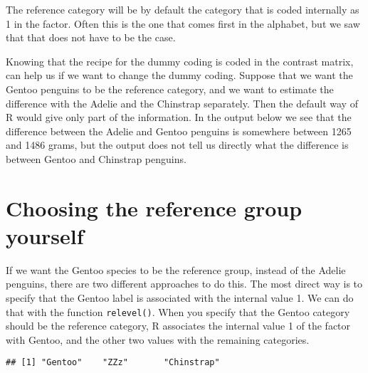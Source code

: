 The reference category will be by default the category that is coded internally as 1 in the factor. Often this is the one that comes first in the alphabet, but we saw that that does not have to be the case. 

Knowing that the recipe for the dummy coding is coded in the contrast matrix, can help us if we want to change the dummy coding. Suppose that we want the Gentoo penguins to be the reference category, and we want to estimate the difference with the Adelie and the Chinstrap separately. Then the default way of R would give only part of the information. In the output below we see that the difference between the Adelie and Gentoo penguins is somewhere between 1265 and 1486 grams, but the output does not tell us directly what the difference is between Gentoo and Chinstrap penguins. 


\begin{knitrout}
\color{fgcolor}
\end{knitrout}


\section{Choosing the reference group yourself}

If we want the Gentoo species to be the reference group, instead of the Adelie penguins, there are two different approaches to do this. The most direct way is to specify that the Gentoo label is associated with the internal value 1. We can do that with the function \texttt{relevel()}. When you specify that the Gentoo category should be the reference category, R associates the internal value 1 of the factor with Gentoo, and the other two values with the remaining categories. 

\begin{knitrout}
\color{fgcolor}\begin{kframe}
\begin{alltt}
\hlopt{$} \hlkwb{<-} \hlopt{$}  \hlstd{=} \hlstd{)}
\hlopt{$} 
\end{alltt}
\begin{verbatim}
## [1] "Gentoo"    "ZZz"       "Chinstrap"
\end{verbatim}
\end{kframe}
\end{knitrout}

